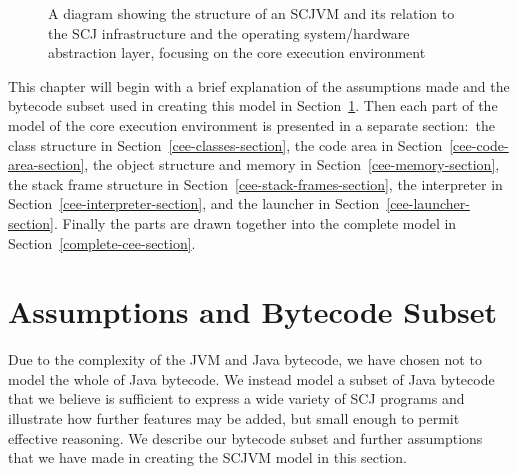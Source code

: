 \documentclass[a4paper,10pt]{report}
\begin{document}
\begin{figure}[ht]
  \caption{A diagram showing the structure of an SCJVM and its
    relation to the SCJ infrastructure and the operating
    system/hardware abstraction layer, focusing on the core execution
    environment}
  \label{cee-fig}
\end{figure}

This chapter will begin with a brief explanation of the assumptions 
made and the bytecode subset used in creating this model in
Section~\ref{cee-assumptions-section}.
Then each part of the \Circus{} model of the core execution environment is
presented in a separate section:~the class structure in
Section~\ref{cee-classes-section}, the code area in
Section~\ref{cee-code-area-section}, the object structure and memory
in Section~\ref{cee-memory-section}, the stack frame structure in
Section~\ref{cee-stack-frames-section}, the interpreter in
Section~\ref{cee-interpreter-section}, and the launcher in
Section~\ref{cee-launcher-section}.
Finally the parts are drawn together into the complete model in
Section~\ref{complete-cee-section}.

\section{Assumptions and Bytecode Subset}
\label{cee-assumptions-section}

Due to the complexity of the JVM and Java bytecode, we have chosen not
to model the whole of Java bytecode.
We instead model a subset of Java bytecode that we believe is
sufficient to express a wide variety of SCJ programs and illustrate
how further features may be added, but small enough to permit
effective reasoning.
We describe our bytecode subset and further assumptions that we have
made in creating the SCJVM model in this section.
\end{document}
